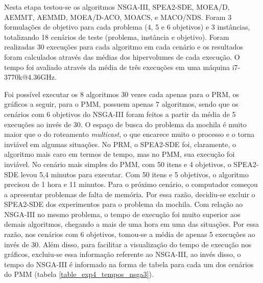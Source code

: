 Nesta etapa testou-se os algoritmos NSGA-III, SPEA2-SDE, MOEA/D, AEMMT, AEMMD, MOEA/D-ACO, MOACS, e MACO/NDS. Foram 3 formulações de objetivo para cada problema (4, 5 e 6 objetivos) e 3 instâncias, totalizando 18 cenários de teste (problema, instância e objetivo). Foram realizadas 30 execuções para cada algoritmo em cada cenário e os resultados foram calculados através das médias dos hipervolumes de cada execução. O tempo foi avaliado através da média de três execuções em uma máquina i7-3770k@4.36GHz.

Foi possível executar os 8 algoritmos 30 vezes cada apenas para o PRM, os gráficos a seguir, para o PMM, possuem apenas 7 algoritmos, sendo que os cenários com 6 objetivos do NSGA-III foram feitos a partir da média de 5 execuções ao invés de 30. O espaço de busca do problema da mochila é muito maior que o do roteamento \textit{multicast}, o que encarece muito o processo e o torna inviável em algumas situações. No PRM, o SPEA2-SDE foi, claramente, o algoritmo mais caro em termos de tempo, mas no PMM, sua execução foi inviável. No cenário mais simples do PMM, com 50 itens e 4 objetivos, o SPEA2-SDE levou 5,4 minutos para executar. Com 50 itens e 5 objetivos, o algoritmo precisou de 1 hora e 11 minutos. Para o próximo cenário, o computador começou a apresentar problemas de falta de memória. Por essa razão, decidiu-se excluir o SPEA2-SDE dos experimentos para o problema da mochila. Com relação ao NSGA-III no mesmo problema, o tempo de execução foi muito superior aos demais algoritmos, chegando a mais de uma hora em uma das situações. Por essa razão, nos cenários com 6 objetivos, tomou-se a média de apenas 5 execuções ao invés de 30. Além disso, para facilitar a visualização do tempo de execução nos gráficos, excluiu-se essa informação referente ao NSGA-III, ao invés disso, o tempo do NSGA-III é informado na forma de tabela para cada um dos cenários do PMM (tabela \ref{table_exp4_tempos_nsga3}).

